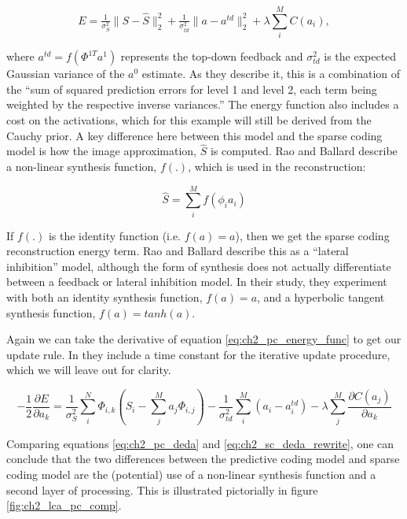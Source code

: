 \begin{equation}\label{eq:ch2_pc_energy_func}
        E =
        \tfrac{1}{\sigma_{S}^{2}} \|S - \hat{S} \|_{2}^{2} +
        \tfrac{1}{\sigma_{td}^{2}} \|a - a^{td}\|_{2}^{2} +
        \lambda \sum\limits_{i}^{M}C(a_{i}),
\end{equation}

where $a^{td} = f\left(\Phi^{1T}a^{1}\right)$ represents the top-down feedback and $\sigma_{td}^2$ is the expected Gaussian variance of the $a^{0}$ estimate. As they describe it, this is a combination of the ``sum of squared prediction errors for level 1 and level 2, each term being weighted by the respective inverse variances.'' The energy function also includes a cost on the activations, which for this example will still be derived from the Cauchy prior. A key difference here between this model and the sparse coding model is how the image approximation, $\hat{S}$ is computed. Rao and Ballard describe a non-linear synthesis function, $f(.)$, which is used in the reconstruction:

\begin{equation}\label{eq:ch2_pc_synthesis}
 \hat{S} = \sum\limits_{i}^{M}f(\phi_{i}a_{i})
\end{equation}

If $f(.)$ is the identity function (i.e. $f(a)=a$), then we get the sparse coding reconstruction energy term. Rao and Ballard describe this as a ``lateral inhibition'' model, although the form of synthesis does not actually differentiate between a feedback or lateral inhibition model. In their study, they experiment with both an identity synthesis function, $f(a)=a$, and a hyperbolic tangent synthesis function, $f(a)=tanh(a)$.

Again we can take the derivative of equation \eqref{eq:ch2_pc_energy_func} to get our update rule. In \parencite{rao1999predictive} they include a time constant for the iterative update procedure, which we will leave out for clarity.

\begin{equation}\label{eq:ch2_pc_deda}
    - \frac{1}{2}\frac{\partial E}{\partial a_{k}}
    =
        \frac{1}{\sigma_{S}^{2}}\sum\limits_{i}^{N} \Phi_{i,k} \left(S_{i} - \sum\limits_{j}^{M}a_{j} \Phi_{i,j}\right) -
        \frac{1}{\sigma_{td}^{2}}\sum\limits_{i}^{M}(a_{i}-a_{i}^{td}) -
        \lambda \sum\limits_{j}^{M}\frac{\partial C(a_{j})}{\partial a_{k}}
\end{equation}

Comparing equations \eqref{eq:ch2_pc_deda} and \eqref{eq:ch2_sc_deda_rewrite}, one can conclude that the two differences between the predictive coding model and sparse coding model are the (potential) use of a non-linear synthesis function and a second layer of processing. This is illustrated pictorially in figure \ref{fig:ch2_lca_pc_comp}.

